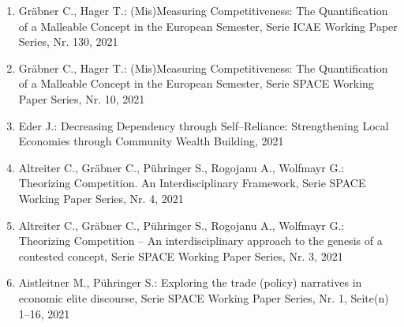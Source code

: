 \begin{enumerate}
	 \item Gräbner C., Hager T.: (Mis)Measuring Competitiveness: The Quantification of a Malleable Concept in the European Semester, Serie ICAE Working Paper Series, Nr. 130, 2021
	 \item Gräbner C., Hager T.: (Mis)Measuring Competitiveness: The Quantification of a Malleable Concept in the European Semester, Serie SPACE Working Paper Series, Nr. 10, 2021
	 \item Eder J.: Decreasing Dependency through Self--Reliance: Strengthening Local Economies through Community Wealth Building, 2021
	 \item Altreiter C., Gräbner C., Pühringer S., Rogojanu A., Wolfmayr G.: Theorizing Competition. An Interdisciplinary Framework, Serie SPACE Working Paper Series, Nr. 4, 2021
	 \item Altreiter C., Gräbner C., Pühringer S., Rogojanu A., Wolfmayr G.: Theorizing Competition -- An interdisciplinary approach to the genesis of a contested concept, Serie SPACE Working Paper Series, Nr. 3, 2021
	 \item Aistleitner M., Pühringer S.: Exploring the trade (policy) narratives in economic elite discourse, Serie SPACE Working Paper Series, Nr. 1, Seite(n) 1--16, 2021
\end{enumerate}
